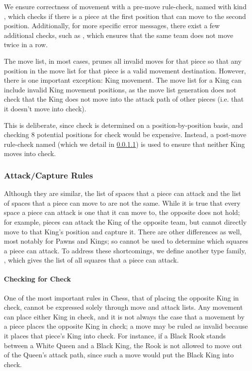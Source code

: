 We ensure correctness of movement with a pre-move rule-check, named  with kind , which checks if there is a piece at the first position that can move to the second position. Additionally, for more specific error messages, there exist a few additional checks, such as , which ensures that the same team does not move twice in a row.

The move list, in most cases, prunes all invalid moves for that piece so that any position in the move list for that piece is a valid movement destination. However, there is one important exception: King movement. The move list for a King can include invalid King movement positions, as the move list generation does not check that the King does not move into the attack path of other pieces (i.e. that it doesn't move into check).

This is deliberate, since check is determined on a position-by-position basis, and checking 8 potential positions for check would be expensive. Instead, a post-move rule-check named  (which we detail in \cref{checksection}) is used to ensure that neither King moves into check.

\subsubsection{Attack/Capture Rules}

Although they are similar, the list of spaces that a piece can attack and the list of spaces that a piece can move to are not the same. While it is true that every space a piece can attack is one that it can move to, the opposite does not hold; for example, pieces can attack the King of the opposite team, but cannot directly move to that King's position and capture it. There are other differences as well, most notably for Pawns and Kings; so  cannot be used to determine which squares a piece can attack. To address these shortcomings, we define another type family, , which gives the list of all squares that a piece can attack.

\paragraph{Checking for Check} \label{checksection}

One of the most important rules in Chess, that of placing the opposite King in check, cannot be expressed solely through move and attack lists. Any movement can place either King in check, and it is not always the case that a movement by a piece places the opposite King in check; a move may be ruled as invalid because it places that piece's King into check. For instance, if a Black Rook stands between a White Queen and a Black King, the Rook is not allowed to move out of the Queen's attack path, since such a move would put the Black King into check.

